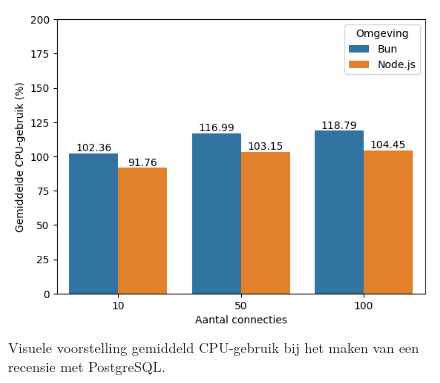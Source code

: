   \begin{figure}[H]
    \centering
    \includegraphics[width=0.7\columnwidth]{graphics/PostPostgresCpu.png}
    \caption[CPU-gebruik POST verzoek met PostgreSQL]{\label{fig:postcpupostgres}Visuele voorstelling gemiddeld CPU-gebruik bij het maken van een recensie met PostgreSQL.}
  \end{figure}
